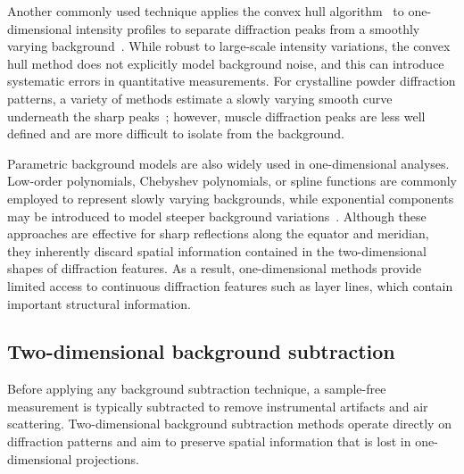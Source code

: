 \documentclass[iucr]{iucrjournals}
\begin{document}
Another commonly used technique applies the convex hull algorithm~\cite{jarvis1973convex_hull} to one-dimensional intensity profiles to separate diffraction peaks from a smoothly varying background~\cite{lee2019musclex}. While robust to large-scale intensity variations, the convex hull method does not explicitly model background noise, and this can introduce systematic errors in quantitative measurements. For crystalline powder diffraction patterns, a variety of methods estimate a slowly varying smooth curve underneath the sharp peaks~\cite{bruckner2000background, PolarBackground2024, ning2014beads, baek2015baseline, prescher2015dioptas}; however, muscle diffraction peaks are less well defined and are more difficult to isolate from the background.

Parametric background models are also widely used in one-dimensional analyses. Low-order polynomials, Chebyshev polynomials, or spline functions are commonly employed to represent slowly varying backgrounds, while exponential components may be introduced to model steeper background variations~\cite{rajkumar2007fibrefix}. Although these approaches are effective for sharp reflections along the equator and meridian, they inherently discard spatial information contained in the two-dimensional shapes of diffraction features. As a result, one-dimensional methods provide limited access to continuous diffraction features such as layer lines, which contain important structural information.

\subsection{Two-dimensional background subtraction}

Before applying any background subtraction technique, a sample-free measurement is typically subtracted to remove instrumental artifacts and air scattering. Two-dimensional background subtraction methods operate directly on diffraction patterns and aim to preserve spatial information that is lost in one-dimensional projections.
\end{document}
